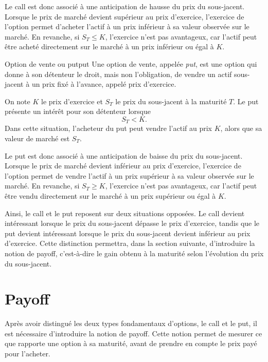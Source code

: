 \documentclass[12pt,a4paper]{report}
\begin{document}
Le call est donc associé à une anticipation de hausse du prix du sous-jacent. Lorsque le prix de marché devient supérieur au prix d'exercice, l'exercice de l'option permet d'acheter l'actif à un prix inférieur à sa valeur observée sur le marché. En revanche, si $S_T \leq K$, l'exercice n'est pas avantageux, car l'actif peut être acheté directement sur le marché à un prix inférieur ou égal à $K$.

\begin{definition}{Option de vente ou put}{put}
Une option de vente, appelée \textit{put}, est une option qui donne à son détenteur le droit, mais non l'obligation, de vendre un actif sous-jacent à un prix fixé à l'avance, appelé prix d'exercice.

On note $K$ le prix d'exercice et $S_T$ le prix du sous-jacent à la maturité $T$. Le put présente un intérêt pour son détenteur lorsque
\[
S_T < K.
\]
Dans cette situation, l'acheteur du put peut vendre l'actif au prix $K$, alors que sa valeur de marché est $S_T$.
\end{definition}

Le put est donc associé à une anticipation de baisse du prix du sous-jacent. Lorsque le prix de marché devient inférieur au prix d'exercice, l'exercice de l'option permet de vendre l'actif à un prix supérieur à sa valeur observée sur le marché. En revanche, si $S_T \geq K$, l'exercice n'est pas avantageux, car l'actif peut être vendu directement sur le marché à un prix supérieur ou égal à $K$.

Ainsi, le call et le put reposent sur deux situations opposées. Le call devient intéressant lorsque le prix du sous-jacent dépasse le prix d'exercice, tandis que le put devient intéressant lorsque le prix du sous-jacent devient inférieur au prix d'exercice. Cette distinction permettra, dans la section suivante, d'introduire la notion de payoff, c'est-à-dire le gain obtenu à la maturité selon l'évolution du prix du sous-jacent.


\section{Payoff}

Après avoir distingué les deux types fondamentaux d'options, le call et le put, il est nécessaire d'introduire la notion de payoff. Cette notion permet de mesurer ce que rapporte une option à sa maturité, avant de prendre en compte le prix payé pour l'acheter.
\end{document}
